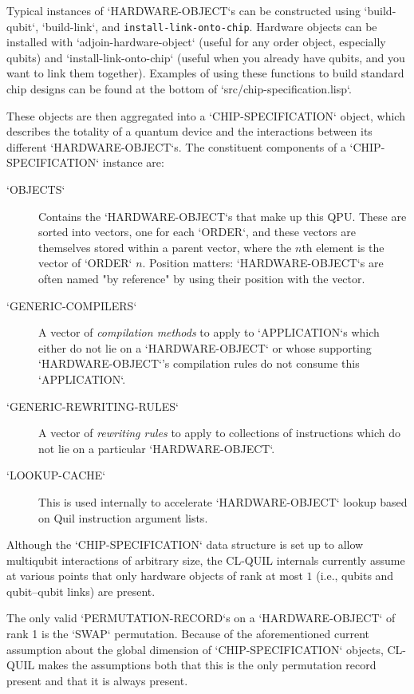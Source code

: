 Typical instances of `HARDWARE-OBJECT`s can be constructed using `build-qubit`, `build-link`, and \texttt{ins\-tall\--link\--onto\--chip}.  Hardware objects can be installed with `adjoin-hardware-object` (useful for any order object, especially qubits) and `install-link-onto-chip` (useful when you already have qubits, and you want to link them together).  Examples of using these functions to build standard chip designs can be found at the bottom of `src/chip-specification.lisp`.

These objects are then aggregated into a `CHIP-SPECIFICATION` object, which describes the totality of a quantum device and the interactions between its different `HARDWARE-OBJECT`s.  The constituent components of a `CHIP-SPECIFICATION` instance are:

\begin{description}
	\item[`OBJECTS`] Contains the `HARDWARE-OBJECT`s that make up this QPU.  These are sorted into vectors, one for each `ORDER`, and these vectors are themselves stored within a parent vector, where the $n$th element is the vector of `ORDER` $n$.  Position matters: `HARDWARE-OBJECT`s are often named "by reference" by using their position with the vector.
	\item[`GENERIC-COMPILERS`] A vector of \textit{compilation methods} to apply to `APPLICATION`s which either do not lie on a `HARDWARE-OBJECT` or whose supporting `HARDWARE-OBJECT`'s compilation rules do not consume this `APPLICATION`.
	\item[`GENERIC-REWRITING-RULES`] A vector of \textit{rewriting rules} to apply to collections of instructions which do not lie on a particular `HARDWARE-OBJECT`.
	\item[`LOOKUP-CACHE`] This is used internally to accelerate `HARDWARE-OBJECT` lookup based on Quil instruction argument lists.
\end{description}

\begin{remark}
Although the `CHIP-SPECIFICATION` data structure is set up to allow multiqubit interactions of arbitrary size, the CL-QUIL internals currently assume at various points that only hardware objects of rank at most $1$ (i.e., qubits and qubit--qubit links) are present.
\end{remark}

\begin{remark}
The only valid `PERMUTATION-RECORD`s on a `HARDWARE-OBJECT` of rank 1 is the `SWAP` permutation.  Because of the aforementioned current assumption about the global dimension of `CHIP-SPECIFICATION` objects, CL-QUIL makes the assumptions both that this is the only permutation record present and that it is always present.
\end{remark}


